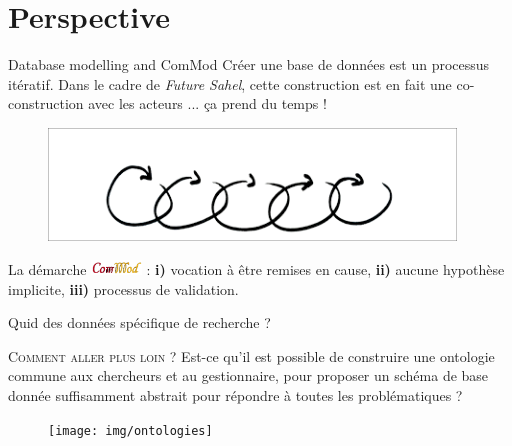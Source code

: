 \documentclass[newPxFont]{beamer}
\begin{document}
\section{Perspective}

\begin{frame}[c]{Database modelling and ComMod}
\vspace{-2em}
Créer une base de données est un processus itératif. Dans le cadre de \textit{Future Sahel}, cette construction est en fait une co-construction avec les acteurs ... ça prend du temps !
\begin{figure}
	\centering
	\includegraphics[height = 3cm]{img/iteration}
\end{figure}
La démarche \includegraphics[height = 0.4cm]{img/logo_commod} : \textbf{i)} vocation à être remises en cause, \textbf{ii)} aucune hypothèse implicite, \textbf{iii)} processus de
validation.
\end{frame}

\begin{frame}[c]{Quid des données spécifique de recherche ?}
\vspace{-2em}
\begin{block}{\textsc{Comment aller plus loin ?}}
  Est-ce qu'il est possible de construire une ontologie commune aux chercheurs et au gestionnaire, pour proposer un schéma de base donnée suffisamment abstrait pour répondre à toutes les problématiques ?
\end{block}
\begin{figure}
	\centering
	\texttt{[image: img/ontologies]}
\end{figure}
\end{frame}
\end{document}
